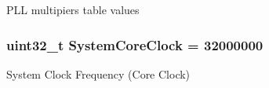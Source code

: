 P\-L\-L multipiers table values \hypertarget{group___s_t_m32_l1xx___system___private___variables_gaa3cd3e43291e81e795d642b79b6088e6}{
\subsubsection[{System\-Core\-Clock}]{\setlength{\rightskip}{0pt plus 5cm}uint32\-\_\-t System\-Core\-Clock = 32000000}}\label{group___s_t_m32_l1xx___system___private___variables_gaa3cd3e43291e81e795d642b79b6088e6}
System Clock Frequency (Core Clock) 